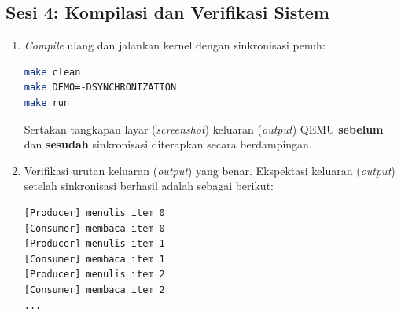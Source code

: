 \subsection{Sesi 4: Kompilasi dan Verifikasi Sistem}

\begin{enumerate}

	\item \textit{Compile} ulang dan jalankan kernel dengan sinkronisasi penuh:
	      \begin{lstlisting}[language=bash, caption={Compile dan jalankan dengan sinkronisasi penuh}]
make clean
make DEMO=-DSYNCHRONIZATION
make run
    \end{lstlisting}

	      Sertakan tangkapan layar (\textit{screenshot}) keluaran (\textit{output}) QEMU \textbf{sebelum} dan \textbf{sesudah}  sinkronisasi diterapkan secara berdampingan.



	\item Verifikasi urutan keluaran (\textit{output}) yang benar. Ekspektasi keluaran (\textit{output}) setelah sinkronisasi berhasil adalah sebagai berikut:

	      \begin{lstlisting}[caption={Ekspektasi keluaran (\textit{output}) \textit{Producer-Consumer} yang tersinkronisasi}]
[Producer] menulis item 0
[Consumer] membaca item 0
[Producer] menulis item 1
[Consumer] membaca item 1
[Producer] menulis item 2
[Consumer] membaca item 2
...
    \end{lstlisting}


\end{enumerate}
